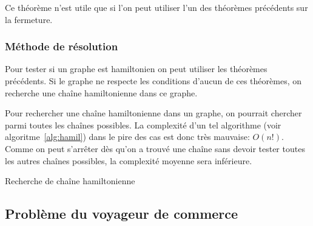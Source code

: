    Ce théorème n'est utile que si l'on peut utiliser l'un des théorèmes
    précédents sur la fermeture.

  \subsubsection{Méthode de résolution}
    Pour tester si un graphe est hamiltonien on peut utiliser les théorèmes
    précédents. Si le graphe ne respecte les conditions d'aucun de ces
    théorèmes, on recherche une chaîne hamiltonienne dans ce graphe.

    Pour rechercher une chaîne hamiltonienne dans un graphe, on pourrait
    chercher parmi toutes les chaînes possibles. La complexité d'un tel
    algorithme (voir algoritme~\ref{alg:hamil}) dans le pire des cas est donc
    très mauvaise: $O(n!)$. Comme on peut s'arrêter dès qu'on a trouvé une
    chaîne sans devoir tester toutes les autres chaînes possibles, la
    complexité moyenne sera inférieure.

    \begin{algorithm}

      \caption{Recherche de chaîne hamiltonienne}
      \label{alg:hamil}
    \end{algorithm}

\subsection{Problème du voyageur de commerce}\label{sec:tsp}
